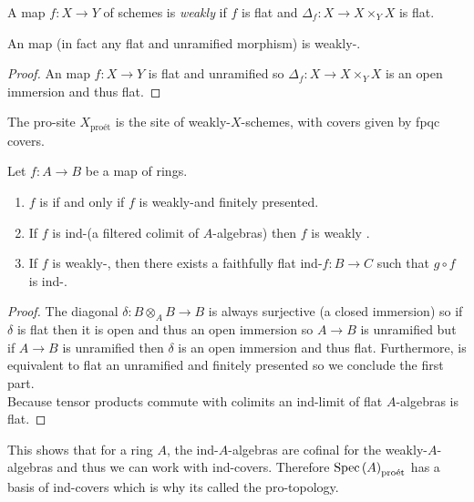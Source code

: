 \documentclass[12pt]{article}
\begin{document}
\newcommand{\proet}{\text{pro\'{e}t}}

\begin{defn}
A map $f : X \to Y$ of schemes is \textit{weakly \etale} if $f$ is flat and $\Delta_f : X \to X \times_Y X$ is flat.
\end{defn}

\begin{prop}
An \etale map (in fact any flat and unramified morphism) is weakly-\etale.
\end{prop}

\begin{proof}
An \etale map $f : X \to Y$ is flat and unramified so $\Delta_f : X \to X \times_Y X$ is an open immersion and thus flat.
\end{proof}

\begin{defn}
The pro-\etale site $X_{\proet}$ is the site of weakly-\etale $X$-schemes, with covers given by fpqc covers.
\end{defn}

\begin{thm}
Let $f : A \to B$ be a map of rings. 
\begin{enumerate}
\item $f$ is \etale if and only if $f$ is weakly-\etale and finitely presented.
\item If $f$ is ind-\etale (a filtered colimit of \etale $A$-algebras) then $f$ is weakly \etale.
\item If $f$ is weakly-\etale, then there exists a faithfully flat ind-\etale $f : B \to C$ such that $g \circ f$ is ind-\etale.
\end{enumerate}
\end{thm}

\begin{proof}
The diagonal $\delta : B \otimes_A B \to B$ is always surjective (a closed immersion) so if $\delta$ is flat then it is open and thus an open immersion so $A \to B$ is unramified but if $A \to B$ is unramified then $\delta$ is an open immersion and thus flat. Furthermore, \etale is equivalent to flat an unramified and finitely presented so we conclude the first part.
\bigskip\\
Because tensor products commute with colimits an ind-limit of flat $A$-algebras is flat. 
\end{proof}

\begin{rmk}
This shows that for a ring $A$, the ind-\etale $A$-algebras are cofinal for the weakly-\etale $A$-algebras and thus we can work with ind-\etale covers. Therefore $\Spec{A}_{\proet}$ has a basis of ind-\etale covers which is why its called the pro-\etale topology. 
\end{rmk}
\end{document}
